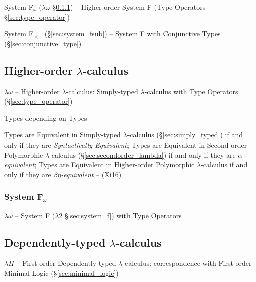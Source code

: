 System F$_\omega$ ($\lambda\omega$ \S\ref{sec:system_fomega}) --
  Higher-order System F (Type Operators \S\ref{sec:type_operator})

System F$_{<:}$ (\S\ref{sec:system_fsub}) -- System F with
  Conjunctive Types (\S\ref{sec:conjunctive_type})



\subsection{Higher-order $\lambda$-calculus}
\label{sec:higherorder_lambda}

$\lambda\underline{\omega}$ -- Higher-order $\lambda$-calculus:
Simply-typed $\lambda$-calculus with Type Operators
(\S\ref{sec:type_operator})

Types depending on Types

Types are Equivalent in Simply-typed $\lambda$-calculus
(\S\ref{sec:simply_typed}) if and only if they are \emph{Syntactically
  Equivalent}; Types are Equivalent in Second-order Polymorphic
$\lambda$-calculus (\S\ref{sec:secondorder_lambda}) if and only if
they are \emph{$\alpha$-equivalent}; Types are Equivalent in
Higher-order Polymorphic $\lambda$-calculus if and only if they are
\emph{$\beta\eta$-equivalent} -- (Xi16)



\subsubsection{System F$_\omega$}\label{sec:system_fomega}

$\lambda\omega$ -- System F ($\lambda2$ \S\ref{sec:system_f}) with
Type Operators



\subsection{Dependently-typed $\lambda$-calculus}
\label{sec:dependent_lambda}

$\lambda\Pi$ -- First-order Dependently-typed $\lambda$-calculus:
correspondence with First-order Minimal Logic
(\S\ref{sec:minimal_logic})

